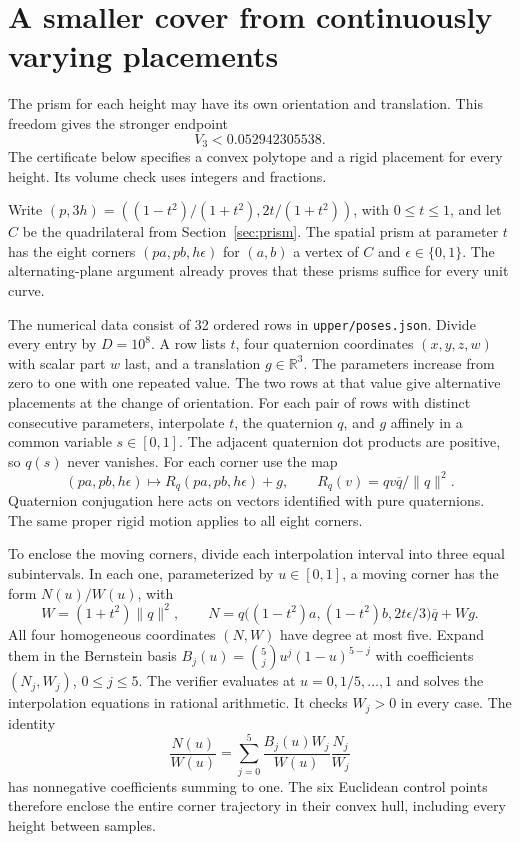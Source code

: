 \section{A smaller cover from continuously varying placements}
\label{sec:adaptive}

The prism for each height may have its own orientation and translation.
This freedom gives the stronger endpoint
\[
                         V_3<0.052942305538 .
\]
The certificate below specifies a convex polytope and a rigid placement
for every height. Its volume check uses integers and fractions.

Write $(p,3h)=((1-t^2)/(1+t^2),2t/(1+t^2))$, with $0\le t\le1$,
and let $C$ be the quadrilateral from Section~\ref{sec:prism}.
The spatial prism at parameter $t$ has the eight corners
$(pa,pb,h\epsilon)$ for $(a,b)$ a vertex of $C$ and
$\epsilon\in\{0,1\}$. The alternating-plane argument already proves
that these prisms suffice for every unit curve.

The numerical data consist of 32 ordered rows in
\texttt{upper/poses.json}. Divide every entry by $D=10^8$.
A row lists $t$, four quaternion coordinates $(x,y,z,w)$ with scalar
part $w$ last, and a translation $g\in\mathbb R^3$. The parameters
increase from zero to one with one repeated value. The two rows at
that value give alternative placements at the change of orientation.
For each pair of rows with distinct consecutive parameters,
interpolate $t$, the quaternion $q$, and $g$ affinely in a common
variable $s\in[0,1]$. The adjacent quaternion dot products are
positive, so $q(s)$ never vanishes. For each corner use the map
\[
 (pa,pb,h\epsilon)\longmapsto
 R_q(pa,pb,h\epsilon)+g,\qquad
 R_q(v)=qv\overline q/\|q\|^2 .
\]
Quaternion conjugation here acts on vectors identified with pure
quaternions. The same proper rigid motion applies to all eight corners.

To enclose the moving corners, divide each interpolation interval into
three equal subintervals. In each one, parameterized by $u\in[0,1]$,
a moving corner has the form $N(u)/W(u)$, with
\[
 W=(1+t^2)\|q\|^2,\qquad
 N=q\big((1-t^2)a,(1-t^2)b,2t\epsilon/3\big)\overline q+Wg .
\]
All four homogeneous coordinates $(N,W)$ have degree at most five.
Expand them in the Bernstein basis
$B_j(u)=\binom5j u^j(1-u)^{5-j}$ with coefficients $(N_j,W_j)$,
$0\le j\le5$. The verifier evaluates at $u=0,1/5,\ldots,1$
and solves the interpolation equations in rational arithmetic.
It checks $W_j>0$ in every case. The identity
\[
 \frac{N(u)}{W(u)}
   =\sum_{j=0}^5\frac{B_j(u)W_j}{W(u)}\frac{N_j}{W_j}
\]
has nonnegative coefficients summing to one. The six Euclidean control
points therefore enclose the entire corner trajectory in their convex
hull, including every height between samples.

